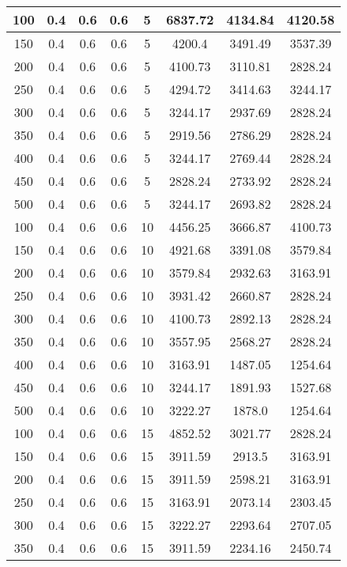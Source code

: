 \documentclass[a4paper, 12pt]{extreport}
\begin{document}
\begin{itemize}
\begin{longtable}{|c|c|c|c|c|c|c|c|}
			100 & 0.4 & 0.6 & 0.6 & 5 & 6837.72 & 4134.84 & 4120.58 \\\hline
			150 & 0.4 & 0.6 & 0.6 & 5 & 4200.4 & 3491.49 & 3537.39 \\\hline
			200 & 0.4 & 0.6 & 0.6 & 5 & 4100.73 & 3110.81 & 2828.24 \\\hline
			250 & 0.4 & 0.6 & 0.6 & 5 & 4294.72 & 3414.63 & 3244.17 \\\hline
			300 & 0.4 & 0.6 & 0.6 & 5 & 3244.17 & 2937.69 & 2828.24 \\\hline
			350 & 0.4 & 0.6 & 0.6 & 5 & 2919.56 & 2786.29 & 2828.24 \\\hline
			400 & 0.4 & 0.6 & 0.6 & 5 & 3244.17 & 2769.44 & 2828.24 \\\hline
			450 & 0.4 & 0.6 & 0.6 & 5 & 2828.24 & 2733.92 & 2828.24 \\\hline
			500 & 0.4 & 0.6 & 0.6 & 5 & 3244.17 & 2693.82 & 2828.24 \\\hline
			100 & 0.4 & 0.6 & 0.6 & 10 & 4456.25 & 3666.87 & 4100.73 \\\hline
			150 & 0.4 & 0.6 & 0.6 & 10 & 4921.68 & 3391.08 & 3579.84 \\\hline
			200 & 0.4 & 0.6 & 0.6 & 10 & 3579.84 & 2932.63 & 3163.91 \\\hline
			250 & 0.4 & 0.6 & 0.6 & 10 & 3931.42 & 2660.87 & 2828.24 \\\hline
			300 & 0.4 & 0.6 & 0.6 & 10 & 4100.73 & 2892.13 & 2828.24 \\\hline
			350 & 0.4 & 0.6 & 0.6 & 10 & 3557.95 & 2568.27 & 2828.24 \\\hline
			400 & 0.4 & 0.6 & 0.6 & 10 & 3163.91 & 1487.05 & 1254.64 \\\hline
			450 & 0.4 & 0.6 & 0.6 & 10 & 3244.17 & 1891.93 & 1527.68 \\\hline
			500 & 0.4 & 0.6 & 0.6 & 10 & 3222.27 & 1878.0 & 1254.64 \\\hline
			100 & 0.4 & 0.6 & 0.6 & 15 & 4852.52 & 3021.77 & 2828.24 \\\hline
			150 & 0.4 & 0.6 & 0.6 & 15 & 3911.59 & 2913.5 & 3163.91 \\\hline
			200 & 0.4 & 0.6 & 0.6 & 15 & 3911.59 & 2598.21 & 3163.91 \\\hline
			250 & 0.4 & 0.6 & 0.6 & 15 & 3163.91 & 2073.14 & 2303.45 \\\hline
			300 & 0.4 & 0.6 & 0.6 & 15 & 3222.27 & 2293.64 & 2707.05 \\\hline
			350 & 0.4 & 0.6 & 0.6 & 15 & 3911.59 & 2234.16 & 2450.74 \\\hline

\end{longtable}
\end{itemize}
\end{document}
